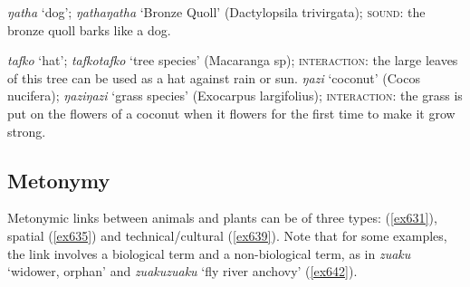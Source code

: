 	\begin{exe}
		\ex \label{ex645} \emph{ŋatha} `dog'; \emph{ŋathaŋatha} `Bronze Quoll' (Dactylopsila trivirgata); \textsc{sound:} the bronze quoll barks like a dog.
	\end{exe}%
	\begin{exe}
	\ex \label{ex628}
	\begin{xlist}
		\ex \label{ex629} \emph{tafko} `hat'; \emph{tafkotafko} `tree species' (Macaranga sp); \textsc{interaction:} the large leaves of this tree can be used as a hat against rain or sun.
		\ex \label{ex630} \emph{ŋazi} `coconut' (Cocos nucifera); \emph{ŋaziŋazi} `grass species' (Exocarpus largifolius); \textsc{interaction:} the grass is put on the flowers of a coconut when it flowers for the first time to make it grow strong.
	\end{xlist}
\end{exe}%

\subsection{Metonymy}\label{redupmetonymy}

Metonymic links between animals and plants can be of three types:  (\ref{ex631}), spatial (\ref{ex635}) and technical/cultural (\ref{ex639}). Note that for some examples, the link involves a biological term and a non-biological term, as in \emph{zuaku} `widower, orphan' and \emph{zuakuzuaku} `fly river anchovy' (\ref{ex642}).


